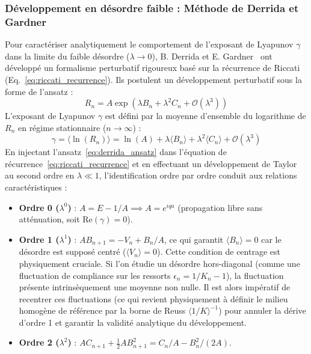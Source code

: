 \subsubsection{Développement en désordre faible : Méthode de Derrida et Gardner}
Pour caractériser analytiquement le comportement de l'exposant de Lyapunov $\gamma$ dans la limite du faible désordre ($\lambda \to 0$), B. Derrida et E. Gardner~\cite{derrida1984lyapounov} ont développé un formalisme perturbatif rigoureux basé sur la récurrence de Riccati (Eq.~\ref{eq:riccati_recurrence}). Ils postulent un développement perturbatif sous la forme de l'ansatz :
\begin{equation}
    R_n = A \exp\left( \lambda B_n + \lambda^2 C_n + \mathcal{O}(\lambda^3) \right)
    \label{eq:derrida_ansatz}
\end{equation}
L'exposant de Lyapunov $\gamma$ est défini par la moyenne d'ensemble du logarithme de $R_n$ en régime stationnaire ($n \to \infty$) :
\begin{equation}
    \gamma = \langle \ln(R_n) \rangle = \ln(A) + \lambda \langle B_n \rangle + \lambda^2 \langle C_n \rangle + \mathcal{O}(\lambda^3)
    \label{eq:lyapunov_average}
\end{equation}
En injectant l'ansatz~\eqref{eq:derrida_ansatz} dans l'équation de récurrence~\eqref{eq:riccati_recurrence} et en effectuant un développement de Taylor au second ordre en $\lambda \ll 1$, l'identification ordre par ordre conduit aux relations caractéristiques :
\begin{itemize}
    \item \textbf{Ordre 0 ($\lambda^0$)} : $A = E - 1/A \implies A = e^{iqa}$ (propagation libre sans atténuation, soit $\text{Re}(\gamma) = 0$).
    \item \textbf{Ordre 1 ($\lambda^1$)} : $A B_{n+1} = -V_n + B_n / A$, ce qui garantit $\langle B_n \rangle = 0$ car le désordre est supposé centré ($\langle V_n \rangle = 0$). Cette condition de centrage est physiquement cruciale. Si l'on étudie un désordre hors-diagonal (comme une fluctuation de compliance sur les ressorts $\epsilon_n = 1/K_n - 1$), la fluctuation présente intrinsèquement une moyenne non nulle. Il est alors impératif de recentrer ces fluctuations (ce qui revient physiquement à définir le milieu homogène de référence par la borne de Reuss $\langle 1/K \rangle^{-1}$) pour annuler la dérive d'ordre 1 et garantir la validité analytique du développement.
    \item \textbf{Ordre 2 ($\lambda^2$)} : $A C_{n+1} + \frac{1}{2}A B_{n+1}^2 = C_n / A - B_n^2 / (2A)$.
\end{itemize}
